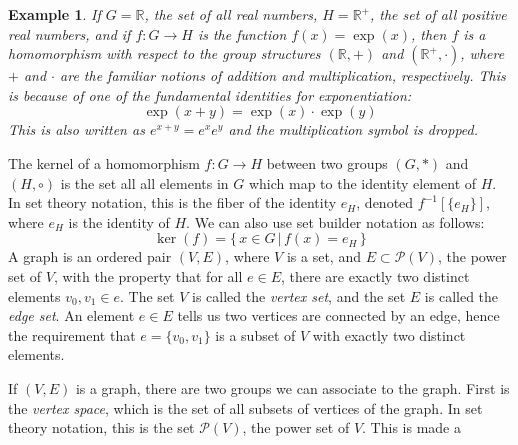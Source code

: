 \documentclass{article}
\theoremstyle{plain}
\theoremstyle{normal}
\newtheorem{example}{Example}[section]
\begin{document}
            \begin{example}
                If $G=\mathbb{R}$, the set of all real numbers,
                $H=\mathbb{R}^{+}$, the set of all positive real numbers, and
                if $f:G\rightarrow{H}$ is the function $f(x)=\exp(x)$, then
                $f$ is a homomorphism with respect to the group structures
                $(\mathbb{R},+)$ and $(\mathbb{R}^{+},\cdot)$, where
                $+$ and $\cdot$ are the familiar notions of addition and
                multiplication, respectively. This is because of one of the
                fundamental identities for exponentiation:
                \begin{equation}
                    \exp(x+y)=\exp(x)\cdot\exp(y)
                \end{equation}
                This is also written as $e^{x+y}=e^{x}e^{y}$ and the
                multiplication symbol is dropped.
            \end{example}
            The kernel of a homomorphism $f:G\rightarrow{H}$ between two
            groups $(G,*)$ and $(H,\circ)$ is the set all all elements in
            $G$ which map to the identity element of $H$. In set theory
            notation, this is the fiber of the identity $e_{H}$, denoted
            $f^{-1}[\{e_{H}\}]$, where $e_{H}$ is the identity of $H$. We can
            also use set builder notation as follows:
            \begin{equation}
                \ker(f)=\{\,x\in{G}\,|\,f(x)=e_{H}\,\}
            \end{equation}
            A graph is an ordered pair $(V,E)$, where $V$ is a set, and
            $E\subset\mathcal{P}(V)$, the power set of $V$, with the property
            that for all $e\in{E}$, there are exactly two distinct elements
            $v_{0},v_{1}\in{e}$. The set $V$ is called the \textit{vertex set},
            and the set $E$ is called the \textit{edge set}. An element
            $e\in{E}$ tells us two vertices are connected by an edge, hence
            the requirement that $e=\{v_{0},v_{1}\}$ is a subset of $V$ with
            exactly two distinct elements.
            \par\hfill\par
            If $(V,E)$ is a graph, there are two groups we can associate to the
            graph. First is the \textit{vertex space}, which is the set of
            all subsets of vertices of the graph. In set theory notation, this
            is the set $\mathcal{P}(V)$, the power set of $V$. This is made a
\end{document}
